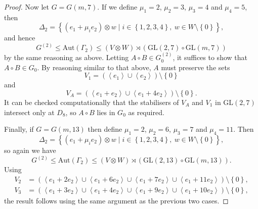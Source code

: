\documentclass[10pt]{amsart}
\theoremstyle{definition}
\theoremstyle{plain}
\theoremstyle{plain}
\theoremstyle{plain}
\theoremstyle{plain}
\newcommand{\Aut}{\mathrm{Aut}}
\newcommand{\GL}{\mathrm{GL}}
\begin{document}
\begin{proof}
Now let $G = G{\left(m, 7 \right)}$. If we define $\mu_1 = 2$, $\mu_2 = 3$, $\mu_3 = 4$ and $\mu_4 = 5$, then
\begin{displaymath}
    \Delta_2 = {\left\{\left(e_1 + \mu_i e_2 \right) \otimes w \mid i \in {\left\{1, 2, 3, 4 \right\}},\ w \in W \setminus \left\{0 \right\}\right\}},
\end{displaymath}
and hence
\begin{displaymath}
    G^{\left(2 \right)} \leqslant \Aut{\left(\Gamma_2 \right)} \leqslant \left(V \otimes W \right) \rtimes {\left(\GL{\left(2, 7 \right)} \circ \GL{\left(m, 7 \right)}\right)}
\end{displaymath}
by the same reasoning as above. Letting $A \circ B \in G^{\left(2 \right)}_0$, it suffices to show that $A \circ B \in G_0$. By reasoning similar to that above, $A$ must preserve the sets
\begin{displaymath}
    V_1 = \left(\left<e_1 \right> \cup \left<e_2 \right> \right) \setminus \left\{0 \right\}
\end{displaymath}
and
\begin{displaymath}
    V_A = \left(\left<e_1 + e_2 \right> \cup \left<e_1 + 4 e_2 \right> \right) \setminus {\left\{0 \right\}}.
\end{displaymath}
It can be checked computationally that the stabilisers of $V_A$ and $V_1$ in $\GL{\left(2, 7 \right)}$ intersect only at $D_8$, so $A \circ B$ lies in $G_0$ as required.

Finally, if $G = G{\left(m, 13 \right)}$ then define $\mu_1 = 2$, $\mu_2 = 6$, $\mu_3 = 7$ and $\mu_4 = 11$. Then
\begin{displaymath}
    \Delta_2 = {\left\{\left(e_1 + \mu_i e_2 \right) \otimes w \mid i \in {\left\{1, 2, 3, 4 \right\}},\ w \in W \setminus \left\{0 \right\}\right\}},
\end{displaymath}
so again we have
\begin{displaymath}
    G^{\left(2 \right)} \leqslant \Aut{\left(\Gamma_2 \right)} \leqslant \left(V \otimes W \right) \rtimes {\left(\GL{\left(2, 13 \right)} \circ \GL{\left(m, 13 \right)}\right)}.
\end{displaymath}
Using
\begin{align*}
    V_2 &= \left(\left<e_1 + 2 e_2 \right> \cup \left<e_1 + 6 e_2 \right> \cup \left<e_1 + 7 e_2 \right> \cup \left<e_1 + 11 e_2 \right> \right) \setminus {\left\{0 \right\}}, \\
    V_3 &= \left(\left<e_1 + 3 e_2 \right> \cup \left<e_1 + 4 e_2 \right> \cup \left<e_1 + 9 e_2 \right> \cup \left<e_1 + 10 e_2 \right> \right) \setminus {\left\{0 \right\}},
\end{align*}
the result follows using the same argument as the previous two cases.
\end{proof}
\end{document}
